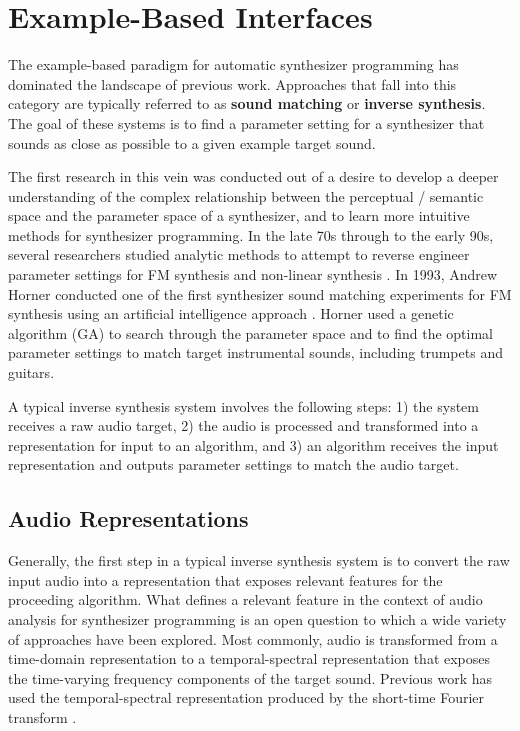 \section{Example-Based Interfaces}
\label{sec:asp-example-based}
The example-based paradigm for automatic synthesizer programming has dominated the landscape of previous work. Approaches that fall into this category are typically referred to as \textbf{sound matching} or \textbf{inverse synthesis}. The goal of these systems is to find a parameter setting for a synthesizer that sounds as close as possible to a given example target sound. 

The first research in this vein was conducted out of a desire to develop a deeper understanding of the complex relationship between the perceptual / semantic space and the parameter space of a synthesizer, and to learn more intuitive methods for synthesizer programming. In the late 70s through to the early 90s, several researchers studied analytic methods to attempt to reverse engineer parameter settings for FM synthesis \cite{justice1979analytic, beauchamp1982synthesis, payne1987microcomputer} and non-linear synthesis \cite{delprat1990parameter}. In 1993, Andrew Horner conducted one of the first synthesizer sound matching experiments for FM synthesis using an artificial intelligence approach \cite{horner1993machine}. Horner used a genetic algorithm (GA) to search through the parameter space and to find the optimal parameter settings to match target instrumental sounds, including trumpets and guitars.

A typical inverse synthesis system involves the following steps: 1) the system receives a raw audio target, 2) the audio is processed and transformed into a representation for input to an algorithm, and 3) an algorithm receives the input representation and outputs parameter settings to match the audio target.


\subsection{Audio Representations}
Generally, the first step in a typical inverse synthesis system is to convert the raw input audio into a representation that exposes relevant features for the proceeding algorithm. What defines a relevant feature in the context of audio analysis for synthesizer programming is an open question to which a wide variety of approaches have been explored. Most commonly, audio is transformed from a time-domain representation to a temporal-spectral representation that exposes the time-varying frequency components of the target sound. Previous work has used the temporal-spectral representation produced by the short-time Fourier transform \cite{horner1995wavetable, horner1995envelope, horner1996piecewise, chinen2007genesynth, yee2007evolving, barkan2019inversynth}. 

